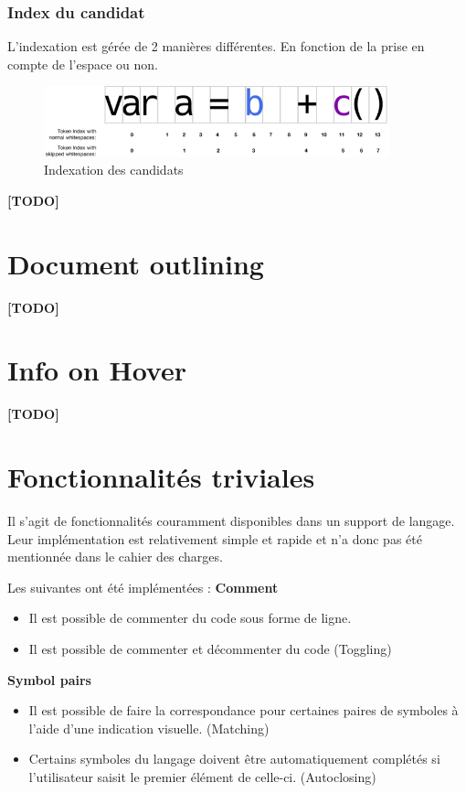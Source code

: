 \documentclass[
    iict, %
    il, %
]{heig-tb}
\begin{document}
\subsubsection{Index du candidat}
L'indexation est gérée de 2 manières différentes. En fonction de la prise en compte de l'espace ou non.

\begin{figure}[!ht]
    \begin{center}
        \includegraphics[width=10cm]{assets/figures/candidat-index.png}
    \end{center}
    \caption[Indexation des candidats]{\label{candidat-index} Indexation des candidats}
\end{figure}

\textbf{[TODO]}

\section{Document outlining}
\textbf{[TODO]}

\section{Info on Hover}
\textbf{[TODO]}

\section{Fonctionnalités triviales}
Il s'agit de fonctionnalités couramment disponibles dans un support de langage. Leur implémentation est relativement simple et rapide et n'a donc pas été mentionnée dans le cahier des charges.

Les suivantes ont été implémentées :
\textbf{Comment}
\begin{itemize}
    \item Il est possible de commenter du code sous forme de ligne.
    \item Il est possible de commenter et décommenter du code (Toggling)
\end{itemize}

\textbf{Symbol pairs}
\begin{itemize}
    \item Il est possible de faire la correspondance pour certaines paires de symboles à l'aide d'une indication visuelle. (Matching)
    \item Certains symboles du langage doivent être automatiquement complétés si l'utilisateur saisit le premier élément de celle-ci. (Autoclosing)
\end{itemize}
\end{document}
